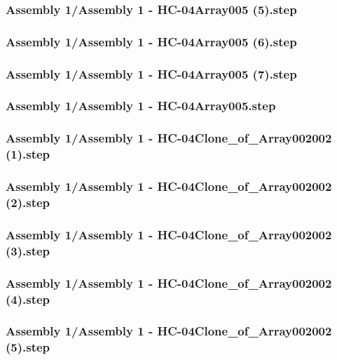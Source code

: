 \documentclass[a4paper,12pt]{article}
\begin{document}
\subsubsection{Assembly 1/Assembly 1 - HC-04Array005 (5).step}

\subsubsection{Assembly 1/Assembly 1 - HC-04Array005 (6).step}

\subsubsection{Assembly 1/Assembly 1 - HC-04Array005 (7).step}

\subsubsection{Assembly 1/Assembly 1 - HC-04Array005.step}

\subsubsection{Assembly 1/Assembly 1 - HC-04Clone_of_Array002002 (1).step}

\subsubsection{Assembly 1/Assembly 1 - HC-04Clone_of_Array002002 (2).step}

\subsubsection{Assembly 1/Assembly 1 - HC-04Clone_of_Array002002 (3).step}

\subsubsection{Assembly 1/Assembly 1 - HC-04Clone_of_Array002002 (4).step}

\subsubsection{Assembly 1/Assembly 1 - HC-04Clone_of_Array002002 (5).step}

\end{document}

